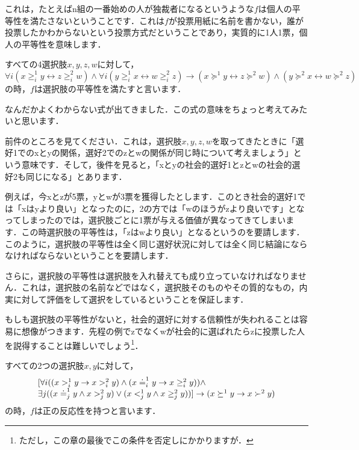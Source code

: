 これは，たとえばn組の一番始めの人が独裁者になるというような$f$は個人の平等性を満たさないということです．これは$f$が投票用紙に名前を書かない，誰が投票したかわからないという投票方式だということであり，実質的に1人1票，個人の平等性を意味します．

\begin{dfn}[選択肢の平等性]
    すべての4選択肢$x,y,z,w$に対して，
    \begin{equation*}
        \forall i (x \geq^1_i y \leftrightarrow z \geq^2_i w) \land \forall i (y \geq^1_i x \leftrightarrow w \geq^2_i z)
        \to (x \succeq^1 y \leftrightarrow z \succeq^2 w) \land (y \succeq^2 x \leftrightarrow w \succeq^2 z)
    \end{equation*}
    の時，$f$は選択肢の平等性を満たすと言います．
\end{dfn}

なんだかよくわからない式が出てきました．この式の意味をちょっと考えてみたいと思います．

前件のところを見てください．これは，選択肢$x,y,z,w$を取ってきたときに「選好1でのxとyの関係，選好2でのzとwの関係が同じ時について考えましょう」という意味です．そして，後件を見ると，「xとyの社会的選好1とzとwの社会的選好2も同じになる」とあります．

例えば，今xとzが5票，yとwが3票を獲得したとします．このとき社会的選好1では「xはyより良い」となったのに，2の方では「wのほうがzより良いです」となってしまったのでは，選択肢ごとに1票が与える価値が異なってきてしまいます．この時選択肢の平等性は，「zはwより良い」となるというのを要請します．このように，選択肢の平等性は全く同じ選好状況に対しては全く同じ結論にならなければならないということを要請します．

さらに，選択肢の平等性は選択肢を入れ替えても成り立っていなければなりません．これは，選択肢の名前などではなく，選択肢そのものやその質的なもの，内実に対して評価をして選択をしているということを保証します．

もしも選択肢の平等性がないと，社会的選好に対する信頼性が失われることは容易に想像がつきます．先程の例でzでなくwが社会的に選ばれたらzに投票した人を説得することは難しいでしょう\footnote{ただし，この章の最後でこの条件を否定しにかかりますが．}．

\begin{dfn}[正の反応性]
    すべての2つの選択肢$x,y$に対して，
    \begin{equation*}
        \begin{array}[h]{l}
            [\forall i ((x >^1_i y \to x >^2_i y) \land (x \doteq^1_i y \to x \geq^2_i y)) \land \\
            \exists j ((x \doteq^1_j y \land x >^2_j y) \lor (x <^1_j y \land x \geq^2_j y))
            ] \to (x \succeq^1 y \to x \succ^2 y)
        \end{array}
    \end{equation*}
    の時，$f$は正の反応性を持つと言います．
\end{dfn}

